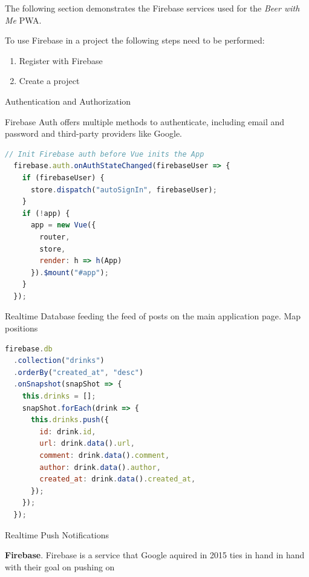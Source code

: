 The following section demonstrates the Firebase services used for the \textit{Beer with Me} PWA.

To use Firebase in a project the following steps need to be performed:
\begin{enumerate}
  \item Register with Firebase
  \item Create a project
\end{enumerate}

Authentication and Authorization

Firebase Auth offers multiple methods to authenticate, including email and password and third-party providers like Google.

\begin{lstlisting}[language=JavaScript, caption=Firebase Auth initiation using VueJS (main.js), label=lst:firebase-auth]
  // Init Firebase auth before Vue inits the App
  firebase.auth.onAuthStateChanged(firebaseUser => {
    if (firebaseUser) {
      store.dispatch("autoSignIn", firebaseUser);
    }
    if (!app) {
      app = new Vue({
        router,
        store,
        render: h => h(App)
      }).$mount("#app");
    }
  });
\end{lstlisting}

Realtime Database feeding the feed of posts on the main application page. Map positions

\begin{lstlisting}[language=JavaScript, caption=Realtime query for new posts (Home.vue), label=lst:firebase-listposts]
firebase.db
  .collection("drinks")
  .orderBy("created_at", "desc")
  .onSnapshot(snapShot => {
    this.drinks = [];
    snapShot.forEach(drink => {
      this.drinks.push({
        id: drink.id,
        url: drink.data().url,
        comment: drink.data().comment,
        author: drink.data().author,
        created_at: drink.data().created_at,
      });
    });
  });
\end{lstlisting}

Realtime Push Notifications

\textbf{Firebase}. Firebase is a service that Google aquired in 2015 ties in hand in hand with their goal on pushing on
